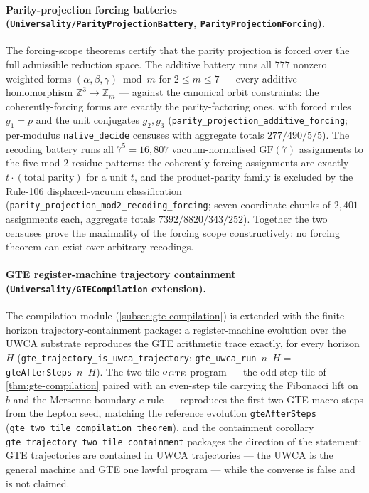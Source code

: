 \documentclass[11pt,a4paper]{article}
\theoremstyle{definition}
\begin{document}
\paragraph{Parity-projection forcing batteries
  (\texttt{Universality/\allowbreak ParityProjectionBattery},
   \texttt{ParityProjectionForcing}).}
The forcing-scope theorems certify that the parity projection is forced over
the full admissible reduction space.
The additive battery runs all $777$ nonzero weighted forms
$(\alpha,\beta,\gamma) \bmod m$ for $2 \le m \le 7$ --- every additive
homomorphism $\mathbb{Z}^3 \to \mathbb{Z}_m$ --- against the canonical orbit
constraints: the coherently-forcing forms are exactly the parity-factoring
ones, with forced rules $g_1 = p$ and the unit conjugates $g_2, g_3$
(\texttt{parity\_projection\_additive\_forcing}; per-modulus
\texttt{native\_decide} censuses with aggregate totals $277/490/5/5$).
The recoding battery runs all $7^5 = 16{,}807$ vacuum-normalised
$\mathrm{GF}(7)$ assignments to the five mod-2 residue patterns: the
coherently-forcing assignments are exactly $t\cdot(\text{total parity})$ for
a unit $t$, and the product-parity family is excluded by the Rule-106
displaced-vacuum classification
(\texttt{parity\_projection\_mod2\_recoding\_forcing}; seven coordinate
chunks of $2{,}401$ assignments each, aggregate totals
$7392/8820/343/252$).
Together the two censuses prove the maximality of the forcing scope
constructively: no forcing theorem can exist over arbitrary recodings.

\paragraph{GTE register-machine trajectory containment
  (\texttt{Universality/\allowbreak GTECompilation} extension).}
The compilation module (\cref{subsec:gte-compilation}) is extended with the
finite-horizon trajectory-containment package: a register-machine evolution
over the UWCA substrate reproduces the GTE arithmetic trace exactly, for
every horizon $H$
(\texttt{gte\_trajectory\_is\_uwca\_trajectory}:
 \texttt{gte\_uwca\_run}~$n$~$H = $ \texttt{gteAfterSteps}~$n$~$H$).
The two-tile $\sigma_{\rm GTE}$ program --- the odd-step tile of
\cref{thm:gte-compilation} paired with an even-step tile carrying the
Fibonacci lift on $b$ and the Mersenne-boundary $c$-rule --- reproduces the
first two GTE macro-steps from the Lepton seed, matching the reference
evolution \texttt{gteAfterSteps}
(\texttt{gte\_two\_tile\_compilation\_theorem}), and the containment
corollary \texttt{gte\_trajectory\_two\_tile\_containment} packages the
direction of the statement: GTE trajectories are contained in UWCA
trajectories --- the UWCA is the general machine and GTE one lawful
program --- while the converse is false and is not claimed.
\end{document}
